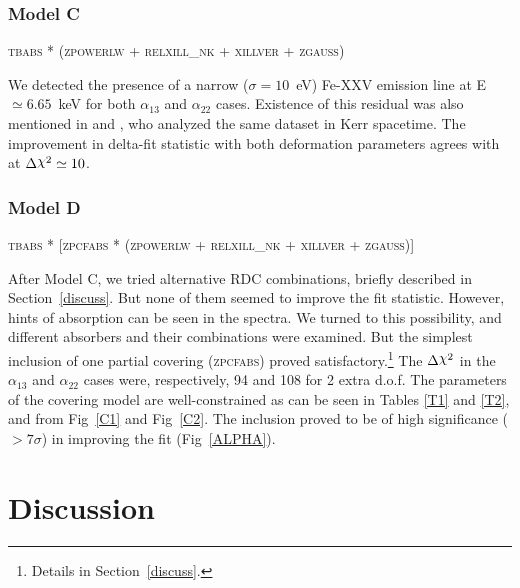 \documentclass[aps,prd,twocolumn,superscriptaddress,nofootinbib,amsmath,amssymb]{revtex4-1}
\DeclareRobustCommand{\rchi}{{\mathpalette\irchi\relax}}
\newcommand{\irchi}[2]{\raisebox{\depth}{$#1\chi$}} %
\begin{document}
\subsubsection{Model C}\label{ModC}
\begin{center}
\textsc{tbabs * (zpowerlw + relxill\_nk + xillver + zgauss)}
\end{center}

We detected the presence of a narrow ($\sigma=10$~eV) Fe-\textrm{XXV} emission line at E~$\simeq 6.65$~keV for both $\alpha_{13}$ and $\alpha_{22}$ cases. Existence of this residual was also mentioned in \cite{Patrick2011} and \cite{W13}, who analyzed the same dataset in Kerr spacetime. The improvement in delta-fit statistic with both deformation parameters agrees with \cite[Table~8 therein]{Patrick2011} at $\Delta\rchi^2 \simeq 10$.



\subsubsection{Model D}\label{ModD}
\begin{center}
\textsc{tbabs * [zpcfabs * (zpowerlw + relxill\_nk + xillver + zgauss)]}
\end{center}

After Model C, we tried alternative RDC combinations, briefly described in Section~\ref{discuss}. But none of them seemed to improve the fit statistic. However, hints of absorption can be seen in the spectra. We turned to this possibility, and different absorbers and their combinations were examined. But the simplest inclusion of one partial covering (\textsc{zpcfabs}) proved satisfactory.\footnote{Details in Section~\ref{discuss}.} The $\Delta\rchi^2$ in the $\alpha_{13}$ and $\alpha_{22}$ cases were, respectively, 94 and 108 for 2 extra d.o.f. The parameters of the covering model are well-constrained as can be seen in Tables \ref{T1} and \ref{T2}, and from Fig~\ref{C1} and Fig~\ref{C2}. The inclusion proved to be of high significance ($>7\sigma$) in improving the fit (Fig~\ref{ALPHA}).






\section{\label{discuss}Discussion}
\end{document}
